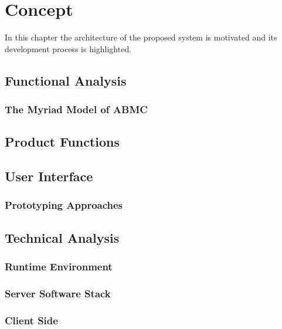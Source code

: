 \chapter{Concept}
\label{chapter:Concept}

In this chapter the architecture of the proposed system is motivated and its development process is highlighted.

\section{Functional Analysis}
\label{section:FunctionalAnalysis}

\pagebreak
\subsection{The Myriad Model of ABMC}

\section{Product Functions}


\section{User Interface}


\subsection{Prototyping Approaches}


\section{Technical Analysis}

\subsection{Runtime Environment}

\subsection{Server Software Stack}

\subsection{Client Side}


